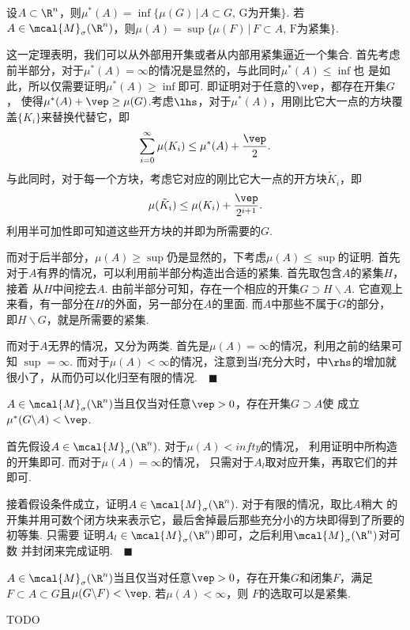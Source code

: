   \begin{thm}
    \label{thm: Borel正则性}
    设$A\subset\R^n$，则$\mu^*(A)=\inf\{\mu(G)\,|\,A\subset G,\,
    \text{G为开集}\}$. 若$A\in\mcal{M}_\sigma(\R^n)$，则$\mu(A)=
    \sup\{\mu(F)\,|\,F\subset A,\,\text{F为紧集}\}$.
  \end{thm}
  \remark
    这一定理表明，我们可以从外部用开集或者从内部用紧集逼近一个集合.
  \proof
    首先考虑前半部分，对于$\mu^*(A)=\infty$的情况是显然的，与此同时$\mu^*(A)\le\inf$也
    是如此，所以仅需要证明$\mu^*(A)\ge\inf$即可. 即证明对于任意的$\vep$，都存在开集$G$，
    使得$\mu^*(A)+\vep\ge\mu(G)$.考虑$\lhs$，对于$\mu^*(A)$，用刚比它大一点的方块覆
    盖$\{K_i\}$来替换代替它，即
    \[
      \sum_{i=0}^\infty\mu(K_i) \le \mu^*(A) + \frac{\vep}{2}.
    \]
    与此同时，对于每一个方块，考虑它对应的刚比它大一点的开方块$\tilde{K}_i$，即
    \[
      \mu(\tilde{K}_i) \le \mu(K_i) + \frac{\vep}{2^{i+1}}.
    \]
    利用半可加性即可知道这些开方块的并即为所需要的$G$.\par
    而对于后半部分，$\mu(A)\ge\sup$仍是显然的，下考虑$\mu(A)\le\sup$的证明. 首先
    对于$A$有界的情况，可以利用前半部分构造出合适的紧集. 首先取包含$A$的紧集$H$，接着
    从$H$中间挖去$A$. 由前半部分可知，存在一个相应的开集$G\supset H\backslash A$.
    它直观上来看，有一部分在$H$的外面，另一部分在$A$的里面. 而$A$中那些不属于$G$的部分，
    即$H\backslash G$，就是所需要的紧集. \par
    而对于$A$无界的情况，又分为两类. 首先是$\mu(A)=\infty$的情况，利用之前的结果可知
    $\sup=\infty$. 而对于$\mu(A)<\infty$的情况，注意到当$l$充分大时，中$\rhs$的增加就很小了，从而仍可以化归至有限的情况.$\quad\blacksquare$

  \begin{thm}
    $A\in\mcal{M}_\sigma(\R^n)$当且仅当对任意$\vep>0$，存在开集$G\supset A$使
    成立$\mu^*(G\backslash A)<\vep$.
  \end{thm}
  \proof
    首先假设$A\in\mcal{M}_\sigma(\R^n)$. 对于$\mu(A)<infty$的情况，
    利用证明中所构造的开集即可. 而对于$\mu(A)=\infty$的情况，
    只需对于$A_l$取对应开集，再取它们的并即可.\par
    接着假设条件成立，证明$A\in\mcal{M}_\sigma(\R^n)$. 对于有限的情况，取比$A$稍大
    的开集并用可数个闭方块来表示它，最后舍掉最后那些充分小的方块即得到了所要的初等集. 只需要
    证明$A_l\in\mcal{M}_\sigma(\R^n)$即可，之后利用$\mcal{M}_\sigma(\R^n)$对可数
    并封闭来完成证明.$\quad\blacksquare$

  \begin{thm}
    $A\in\mcal{M}_\sigma(\R^n)$当且仅当对任意$\vep>0$，存在开集$G$和闭集$F$，满足
    $F\subset A\subset G$且$\mu(G\backslash F)<\vep$. 若$\mu(A)<\infty$，则
    $F$的选取可以是紧集.
  \end{thm}
  \proof
    TODO


